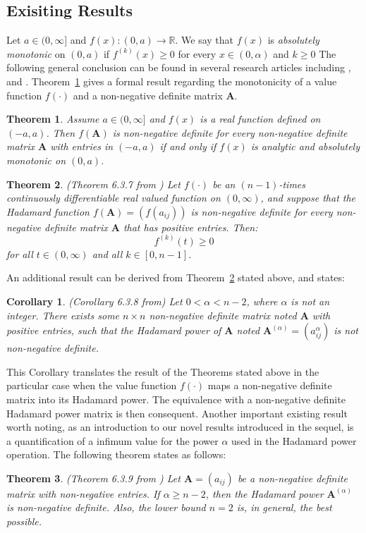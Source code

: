 \documentclass[conference,letterpaper]{IEEEtran}
\numberwithin{equation}{section}
\newcommand{\lbl}{\label}
\newtheorem{theorem}{{\sc Theorem}}[section]
\newtheorem{coro}{{\sc Corollary}}[section]
\begin{document}
\subsection{Exisiting Results}\lbl{known_results}

 Let $a \in (0, \infty]$ and $f(x): (0, a)\to \mathbb{R}$. 
 We say that $f(x)$ is {\it absolutely monotonic} on  $(0, a)$ if $f^{(k)}(x)\geq 0$ for every $x\in (0, \alpha)$ and $k\geq0$ 
 The following general conclusion can be found in several research articles including \cite{schoenberg1988positive},  \cite{vasudeva1979positive} and \cite{hiai2009monotonicity}.
Theorem~\ref{oldth1} gives a formal result regarding the monotonicity of a value function $f(\cdot)$ and a non-negative definite matrix $\mathbf{A}$.
\medskip
\begin{theorem} \label{oldth1}
Assume $a \in (0, \infty]$ and $f(x)$ is a real function defined on $(-a, a)$.  
Then $f(\mathbf{A})$ is non-negative definite for every non-negative definite matrix  $\mathbf{A}$ with  entries in $(-a, a)$ if and only if $f(x)$ is analytic and absolutely monotonic on $(0, a).$
\end{theorem}
\medskip

\begin{theorem}\label{oldth2} (Theorem 6.3.7 from \cite{horn_johnson_1991})
	Let $f(\cdot)$ be an $(n-1)$-times continuously differentiable real valued function on $(0,\infty)$, and suppose that the Hadamard function $f(\mathbf{A})=(f(a_{ij}))$ is non-negative definite for every non-negative definite matrix $\mathbf{A}$ that has positive entries. Then:
$$f^{(k)}(t)\geq 0$$
 for all $t\in(0,\infty)$ and all $k \in [0,n-1]$.
\end{theorem}
\medskip
An additional result can be derived from Theorem~\ref{oldth2} stated above, and states:
\begin{coro}(Corollary 6.3.8 from\cite{horn_johnson_1991})
	Let $0<\alpha<n-2$, where $\alpha$ is not an integer. 
	There exists some $n\times n$ non-negative definite matrix noted $\mathbf{A}$ with positive entries, such that the Hadamard power of  $\mathbf{A}$ noted $\mathbf{A}^{(\alpha)}=(a_{ij}^\alpha)$ is not non-negative definite.
\end{coro}
This Corollary translates the result of the Theorems stated above in the particular case when the value function $f(\cdot)$ maps a non-negative definite matrix into its Hadamard power. 
The equivalence with a non-negative definite Hadamard power matrix is then consequent.
Another important existing result worth noting, as an introduction to our novel results introduced in the sequel, is a quantification of a infimum value for the power $\alpha$ used in the Hadamard power operation. The following theorem states as follows:
\medskip
\begin{theorem} (Theorem 6.3.9 from \cite{horn_johnson_1991})
	Let $\mathbf{A}=(a_{ij})$ be a non-negative definite matrix with non-negative entries. If $\alpha \geq n-2$, then the Hadamard power $\mathbf{A}^{(\alpha)}$ is non-negative definite. 
	Also, the lower bound $n=2$ is, in general, the best possible.
\end{theorem}
\end{document}
